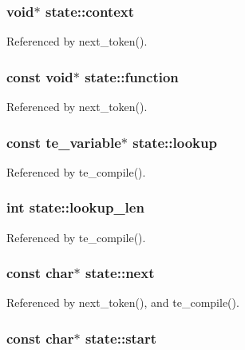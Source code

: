 \subsubsection[{context}]{\setlength{\rightskip}{0pt plus 5cm}void$\ast$ state\+::context}\label{structstate_a0102e66dd6da652109b7f9e23d2b9898}


Referenced by next\+\_\+token().

\subsubsection[{function}]{\setlength{\rightskip}{0pt plus 5cm}const void$\ast$ state\+::function}\label{structstate_acbccc5632c2defb87c66acb2fe35308b}


Referenced by next\+\_\+token().

\subsubsection[{lookup}]{\setlength{\rightskip}{0pt plus 5cm}const te\+\_\+variable$\ast$ state\+::lookup}\label{structstate_ab6e60877bc5b7942473d7965775188f5}


Referenced by te\+\_\+compile().

\subsubsection[{lookup\+\_\+len}]{\setlength{\rightskip}{0pt plus 5cm}int state\+::lookup\+\_\+len}\label{structstate_a08a3ee1e049fc017fea97958e3fc20d6}


Referenced by te\+\_\+compile().

\subsubsection[{next}]{\setlength{\rightskip}{0pt plus 5cm}const char$\ast$ state\+::next}\label{structstate_af025aa9e47a1c241a760a0112ecf3af3}


Referenced by next\+\_\+token(), and te\+\_\+compile().

\subsubsection[{start}]{\setlength{\rightskip}{0pt plus 5cm}const char$\ast$ state\+::start}\label{structstate_aeb61d52566aa4c7fe4eeeecda0afaf38}


